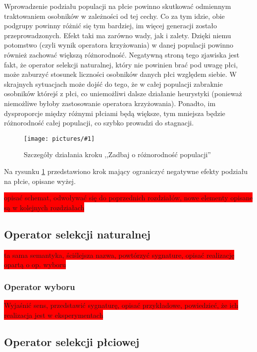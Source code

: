 \documentclass[twoside]{iisthesis}
\newcommand{\todo}{\colorbox{red}}
\newcommand{\img}[1]{\texttt{[image: pictures/\#1]}}
\begin{document}
Wprowadzenie podziału populacji na płcie powinno skutkować odmiennym traktowaniem osobników w zależności od tej cechy. Co za tym idzie, obie podgrupy powinny różnić się tym bardziej, im więcej generacji zostało przeprowadzonych. Efekt taki ma zarówno wady, jak i zalety. Dzięki niemu potomstwo (czyli wynik operatora krzyżowania) w danej populacji powinno również zachować większą różnorodność. Negatywną stroną tego zjawiska jest fakt, że operator selekcji naturalnej, który nie powinien brać pod uwagę płci, może zaburzyć stosunek liczności osobników danych płci względem siebie. W skrajnych sytuacjach może dojść do tego, że w całej populacji zabraknie osobników którejś z płci, co uniemożliwi dalsze działanie heurystyki (ponieważ niemożliwe byłoby zastosowanie operatora krzyżowania). Ponadto, im dysproporcje między różnymi płciami będą większe, tym mniejsza będzie różnorodność całej populacji, co szybko prowadzi do stagnacji.

\begin{figure}[H]
	\caption{Szczegóły działania kroku ,,Zadbaj o różnorodność populacji'' \label{figure:fixing}}
	\img{fixing.png}
\end{figure}

Na rysunku \ref{figure:fixing} przedstawiono krok mający ograniczyć negatywne efekty podziału na płcie, opisane wyżej.

\todo{opisać schemat, odwoływać się do poprzednich rozdziałów, nowe elementy opisane są w kolejnych rozdziałach}

\subsection{Operator selekcji naturalnej} \label{subsection:new_natSel}

\todo{ta sama semantyka, ściślejsza nazwa, powtórzyć sygnature, opisać realizację opartą o op. wyboru}

\subsubsection{Operator wyboru}

\todo{Wyjaśnić sens, przedstawić sygnaturę, opisać przykładowe, powiedzieć, że ich realizacja jest w eksperymentach}

\subsection{Operator selekcji płciowej} \label{subsection:new_genSel}
\end{document}

